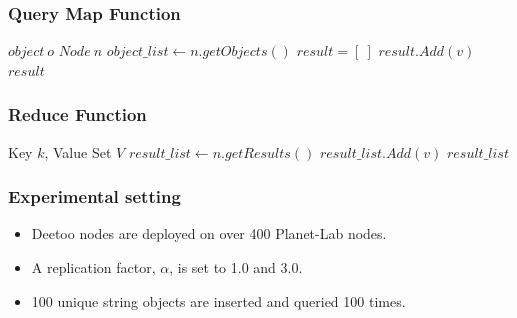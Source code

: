 \documentclass[red]{beamer}
\begin{document}
\begin{frame}
\frametitle{Query Map Function}
\begin{algorithmic}[1]
\REQUIRE $object~ o$     
\REQUIRE $Node~ n$
\STATE $object\_list \leftarrow n.getObjects()$ %
\STATE $result = [~]$
    \STATE $result.Add(v)$
  \ENDIF
\ENDFOR
\RETURN $result$
\end{algorithmic}
\end{frame}


\begin{frame}
\frametitle{Reduce Function}
\begin{algorithmic}[1]
\REQUIRE Key $k$, Value Set $V$
%
%
\STATE $result\_list \leftarrow n.getResults()$ 
  \STATE $result\_list.Add(v)$
\ENDFOR  
\RETURN $result\_list$
\end{algorithmic}
\end{frame}


\begin{frame}
\frametitle{Experimental setting}
\begin{itemize}
\item Deetoo nodes are deployed on over 400 Planet-Lab nodes. 
\item A replication factor, $\alpha$, is set to 1.0 and 3.0.
\item 100 unique string objects are inserted and queried 100 times.
\end{itemize}
\end{frame}
\end{document}
